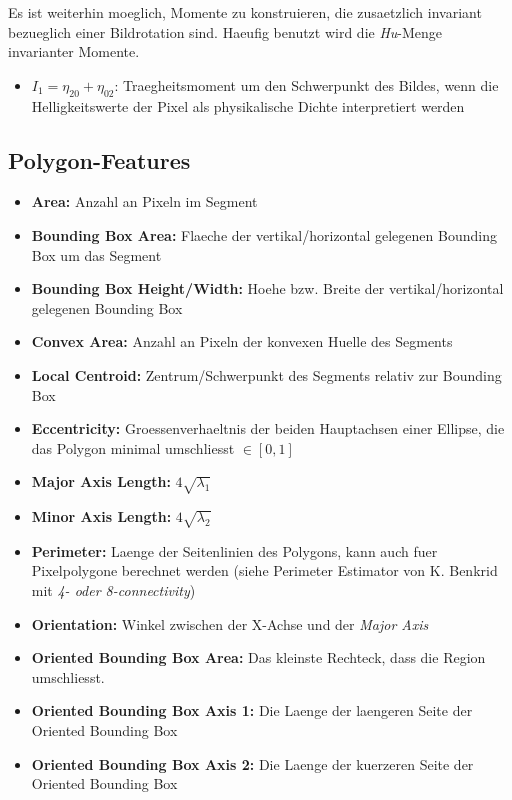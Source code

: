 Es ist weiterhin moeglich, Momente zu konstruieren, die zusaetzlich invariant bezueglich einer Bildrotation sind.
Haeufig benutzt wird die \emph{Hu}-Menge invarianter Momente.

\begin{itemize}
  \item $I_1 = \eta_{20} + \eta_{02}$: Traegheitsmoment um den Schwerpunkt des Bildes, wenn die Helligkeitswerte der Pixel als physikalische Dichte interpretiert werden
\end{itemize}

\subsection{Polygon-Features}

\begin{itemize}
  \item \textbf{Area:} Anzahl an Pixeln im Segment
  \item \textbf{Bounding Box Area:} Flaeche der vertikal/horizontal gelegenen Bounding Box um das Segment
  \item \textbf{Bounding Box Height/Width:} Hoehe bzw. Breite der vertikal/horizontal gelegenen Bounding Box
  \item \textbf{Convex Area:} Anzahl an Pixeln der konvexen Huelle des Segments
  \item \textbf{Local Centroid:} Zentrum/Schwerpunkt des Segments relativ zur Bounding Box
  \item \textbf{Eccentricity:} Groessenverhaeltnis der beiden Hauptachsen einer Ellipse, die das Polygon minimal umschliesst $\in [0, 1]$
  \item \textbf{Major Axis Length:} $4 \sqrt{\lambda_1}$
  \item \textbf{Minor Axis Length:} $4 \sqrt{\lambda_2}$
  \item \textbf{Perimeter:} Laenge der Seitenlinien des Polygons, kann auch fuer Pixelpolygone berechnet werden (siehe Perimeter Estimator von K. Benkrid mit \emph{4- oder 8-connectivity})
  \item \textbf{Orientation:} Winkel zwischen der X-Achse und der \emph{Major Axis}
  \item \textbf{Oriented Bounding Box Area:} Das kleinste Rechteck, dass die Region umschliesst.
  \item \textbf{Oriented Bounding Box Axis 1:} Die Laenge der laengeren Seite der Oriented Bounding Box
  \item \textbf{Oriented Bounding Box Axis 2:} Die Laenge der kuerzeren Seite der Oriented Bounding Box
\end{itemize}

